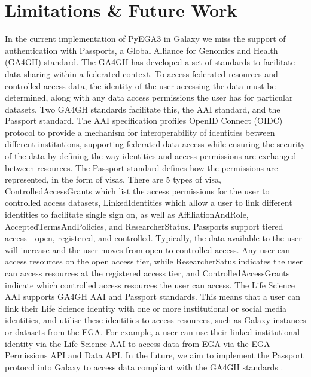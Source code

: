 \section*{Limitations \& Future Work}
In the current implementation of PyEGA3 in Galaxy we miss the support of authentication with Passports, a Global Alliance for Genomics and Health (GA4GH) standard. The GA4GH has developed a set of standards to facilitate data sharing within a federated context.
To access federated resources and controlled access data, the identity of the user accessing the data must be determined, along with any data access permissions the user has for particular datasets. Two GA4GH standards facilitate this, the AAI standard, and the Passport standard.
The AAI specification profiles OpenID Connect (OIDC) protocol to provide a mechanism for interoperability of identities between different institutions, supporting federated data access while ensuring the security of the data by defining the way identities and access permissions are exchanged between resources. 
The Passport standard defines how the permissions are represented, in the form of visas. There are 5 types of visa, ControlledAccessGrants which list the access permissions for the user to controlled access datasets, LinkedIdentities which allow a user to link different identities to facilitate single sign on, as well as AffiliationAndRole, AcceptedTermsAndPolicies, and ResearcherStatus.
Passports support tiered access - open, registered, and controlled. Typically, the data available to the user will increase and the user moves from open to controlled access. Any user can access resources on the open access tier, while ResearcherSatus indicates the user can access resources at the registered access tier, and ControlledAccessGrants indicate which controlled access resources the user can access. 
The Life Science AAI supports GA4GH AAI and Passport standards. This means that a user can link their Life Science identity with one or more institutional or social media identities, and utilise these identities to access resources, such as Galaxy instances or datasets from the EGA. For example, a user can use their linked institutional identity via the Life Science AAI to access data from EGA via the EGA Permissions API and Data API. In the future, we aim to implement the Passport protocol into Galaxy to access data compliant with the GA4GH standards \cite{GA4GH}.


